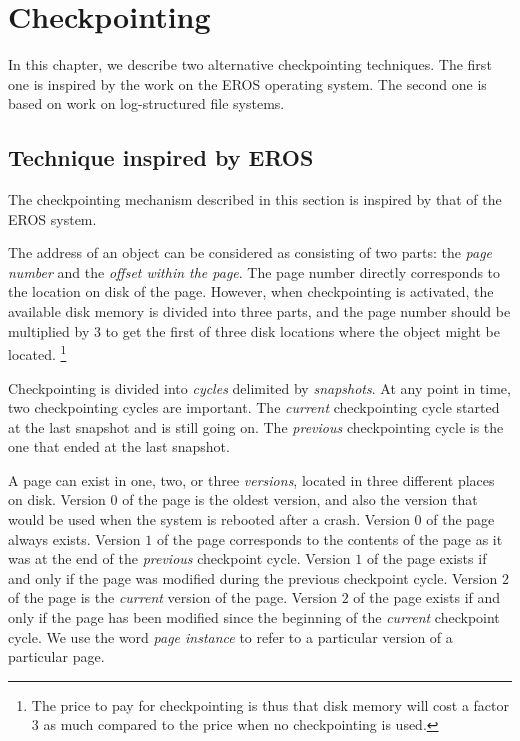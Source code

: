 \chapter{Checkpointing}
\label{chap-checkpointing}

In this chapter, we describe two alternative checkpointing
techniques.  The first one is inspired by the work on the EROS
operating system.  The second one is based on work on log-structured
file systems.

\section{Technique inspired by EROS}

The checkpointing mechanism described in this section is inspired by
that of the EROS system.

The address of an object can be considered as consisting of two parts:
the \emph{page number} and the \emph{offset within the page}.  The
page number directly corresponds to the location on disk of the page.
However, when checkpointing is activated, the available disk memory is
divided into three parts, and the page number should be multiplied by
3 to get the first of three disk locations where the object might be
located.%
\footnote{The price to pay for checkpointing is thus that disk memory
  will cost a factor 3 as much compared to the price when no
  checkpointing is used.}

Checkpointing is divided into \emph{cycles} delimited by
\emph{snapshots}.  At any point in time, two checkpointing cycles are
important.  The \emph{current} checkpointing cycle started at the
last snapshot and is still going on.  The \emph{previous}
checkpointing cycle is the one that ended at the last snapshot.

A page can exist in one, two, or three \emph{versions}, located in
three different places on disk.  Version $0$ of the page is the oldest
version, and also the version that would be used when the system is
rebooted after a crash.  Version $0$ of the page always exists.
Version $1$ of the page corresponds to the contents of the page as it
was at the end of the \emph{previous} checkpoint cycle.  Version $1$
of the page exists if and only if the page was modified during the
previous checkpoint cycle.  Version $2$ of the page is the
\emph{current} version of the page.  Version $2$ of the page exists if
and only if the page has been modified since the beginning of the
\emph{current} checkpoint cycle.  We use the word \emph{page instance}
to refer to a particular version of a particular page.

